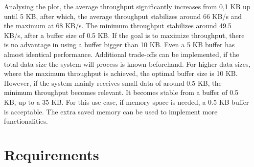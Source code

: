 Analysing the plot, the average throughput significantly increases from 0,1 KB up until 5 KB, after which, the average throughput stabilizes around 66 KB/s and the maximum at 68 KB/s. The minimum throughput stabilizes around 49.5 KB/s, after a buffer size of 0.5 KB. If the goal is to maximize throughput, there is no advantage in using a buffer bigger than 10 KB. Even a 5 KB buffer has almost identical performance. Additional trade-offs can be implemented, if the total data size the system will process is known beforehand. For higher data sizes, where the maximum throughput is achieved, the optimal buffer size is 10 KB. However, if the system mainly receives small data of around 0.5 KB, the minimum throughput becomes relevant. It becomes stable from a buffer of 0.5 KB, up to a 35 KB. For this use case, if memory space is needed, a 0.5 KB buffer is acceptable. The extra saved memory can be used to implement more functionalities.




\section{Requirements}\label{chap:evaluation:requirements}

